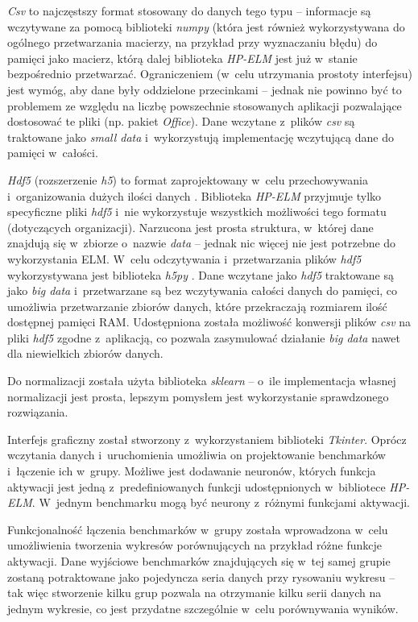 \documentclass[pl]{minipw} %
\begin{document}
\textit{Csv} to najczęstszy format stosowany do danych tego typu -- informacje są wczytywane za pomocą biblioteki \textit{numpy} \cite{numpy} (która jest również wykorzystywana do ogólnego przetwarzania macierzy, na przykład przy wyznaczaniu błędu) do pamięci jako macierz, którą dalej biblioteka \textit{HP-ELM} jest już w~stanie bezpośrednio przetwarzać. Ograniczeniem (w~celu utrzymania prostoty interfejsu) jest wymóg, aby dane były oddzielone przecinkami -- jednak nie powinno być to problemem ze względu na liczbę powszechnie stosowanych aplikacji pozwalające dostosować te pliki (np. pakiet \textit{Office}). Dane wczytane z~plików \textit{csv} są traktowane jako \textit{small data} i~wykorzystują implementację wczytującą dane do pamięci w~całości. 

\textit{Hdf5} (rozszerzenie \textit{h5}) to format zaprojektowany w~celu przechowywania i~organizowania dużych ilości danych \cite{hdf5}. Biblioteka \textit{HP-ELM} przyjmuje tylko specyficzne pliki \textit{hdf5} i~nie wykorzystuje wszystkich możliwości tego formatu (dotyczących organizacji). Narzucona jest prosta struktura, w~której dane znajdują się w~zbiorze o~nazwie \textit{data} -- jednak nic więcej nie jest potrzebne do wykorzystania ELM. W~celu odczytywania i~przetwarzania plików \textit{hdf5} wykorzystywana jest biblioteka \textit{h5py} \cite{h5py}. Dane wczytane jako \textit{hdf5} traktowane są jako \textit{big data} i~przetwarzane są bez wczytywania całości danych do pamięci, co umożliwia przetwarzanie zbiorów danych, które przekraczają rozmiarem ilość dostępnej pamięci RAM. Udostępniona została możliwość konwersji plików \textit{csv} na pliki \textit{hdf5} zgodne z~aplikacją, co pozwala zasymulować działanie \textit{big data} nawet dla niewielkich zbiorów danych.  

Do normalizacji została użyta biblioteka \textit{sklearn} \cite{sklearn} -- o~ile implementacja własnej normalizacji jest prosta, lepszym pomysłem jest wykorzystanie sprawdzonego rozwiązania.

Interfejs graficzny został stworzony z~wykorzystaniem biblioteki \textit{Tkinter}. Oprócz wczytania danych i~uruchomienia umożliwia on projektowanie benchmarków i~łączenie ich w~grupy. Możliwe jest dodawanie neuronów, których funkcja aktywacji jest jedną z~predefiniowanych funkcji udostępnionych w~bibliotece \textit{HP-ELM}. W~jednym benchmarku mogą być neurony z~różnymi funkcjami aktywacji. 

Funkcjonalność łączenia benchmarków w~grupy została wprowadzona w~celu umożliwienia tworzenia wykresów porównujących na przykład różne funkcje aktywacji. Dane wyjściowe benchmarków znajdujących się w~tej samej grupie zostaną potraktowane jako pojedyncza seria danych przy rysowaniu wykresu -- tak więc stworzenie kilku grup pozwala na otrzymanie kilku serii danych na jednym wykresie, co jest przydatne szczególnie w~celu porównywania wyników. 
\end{document}
